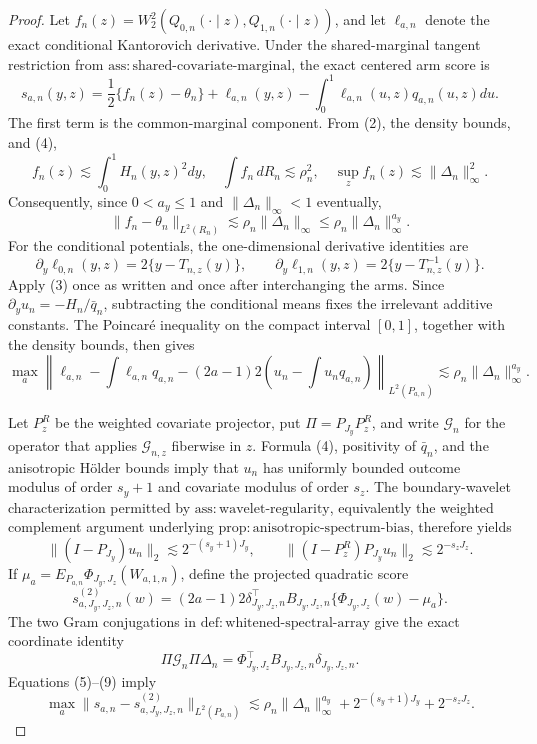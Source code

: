 \documentclass{article}
\begin{document}
\begin{proof}
Let \(f_n(z)=W_2^2(Q_{0,n}(\cdot\mid z),Q_{1,n}(\cdot\mid z))\), and let \(\ell_{a,n}\) denote the exact conditional Kantorovich derivative. Under the shared-marginal tangent restriction from \(\mathrm{ass{:}shared\text{-}covariate\text{-}marginal}\), the exact centered arm score is
\[
s_{a,n}(y,z)
=\frac12\{f_n(z)-\theta_n\}
+\ell_{a,n}(y,z)-\int_0^1\ell_{a,n}(u,z)q_{a,n}(u,z)du. \tag{5}
\]
The first term is the common-marginal component. From (2), the density bounds, and (4),
\[
f_n(z)\lesssim\int_0^1H_n(y,z)^2dy,
\quad
\int f_n\,dR_n\lesssim\rho_n^2,
\quad
\sup_z f_n(z)\lesssim\|\Delta_n\|_\infty^2.
\]
Consequently, since \(0<a_y\le1\) and \(\|\Delta_n\|_\infty<1\) eventually,
\[
\|f_n-\theta_n\|_{L^2(R_n)}
\lesssim\rho_n\|\Delta_n\|_\infty
\le\rho_n\|\Delta_n\|_\infty^{a_y}. \tag{6}
\]
For the conditional potentials, the one-dimensional derivative identities are
\[
\partial_y\ell_{0,n}(y,z)=2\{y-T_{n,z}(y)\},
\qquad
\partial_y\ell_{1,n}(y,z)=2\{y-T_{n,z}^{-1}(y)\}.
\]
Apply (3) once as written and once after interchanging the arms. Since \(\partial_yu_n=-H_n/\bar q_n\), subtracting the conditional means fixes the irrelevant additive constants. The Poincar\'e inequality on the compact interval \([0,1]\), together with the density bounds, then gives
\[
\max_a\left\|
\ell_{a,n}-\int\ell_{a,n}q_{a,n}
-(2a-1)2\left(u_n-\int u_nq_{a,n}\right)
\right\|_{L^2(P_{a,n})}
\lesssim\rho_n\|\Delta_n\|_\infty^{a_y}. \tag{7}
\]

Let \(P_z^R\) be the weighted covariate projector, put \(\Pi=P_{J_y}P_z^R\), and write \(\mathcal G_n\) for the operator that applies \(\mathcal G_{n,z}\) fiberwise in \(z\). Formula (4), positivity of \(\bar q_n\), and the anisotropic H\"older bounds imply that \(u_n\) has uniformly bounded outcome modulus of order \(s_y+1\) and covariate modulus of order \(s_z\). The boundary-wavelet characterization permitted by \(\mathrm{ass{:}wavelet\text{-}regularity}\), equivalently the weighted complement argument underlying \(\mathrm{prop{:}anisotropic\text{-}spectrum\text{-}bias}\), therefore yields
\[
\|(I-P_{J_y})u_n\|_2\lesssim2^{-(s_y+1)J_y},
\qquad
\|(I-P_z^R)P_{J_y}u_n\|_2\lesssim2^{-s_zJ_z}. \tag{8}
\]
If \(\mu_a=E_{P_{a,n}}\Phi_{J_y,J_z}(W_{a,1,n})\), define the projected quadratic score
\[
s^{(2)}_{a,J_y,J_z,n}(w)
=(2a-1)2\delta_{J_y,J_z,n}^{\top}B_{J_y,J_z,n}
\{\Phi_{J_y,J_z}(w)-\mu_a\}.
\]
The two Gram conjugations in \(\mathrm{def{:}whitened\text{-}spectral\text{-}array}\) give the exact coordinate identity
\[
\Pi\mathcal G_n\Pi\Delta_n
=\Phi_{J_y,J_z}^{\top}B_{J_y,J_z,n}\delta_{J_y,J_z,n}. \tag{9}
\]
Equations (5)--(9) imply
\[
\max_a\|s_{a,n}-s^{(2)}_{a,J_y,J_z,n}\|_{L^2(P_{a,n})}
\lesssim
\rho_n\|\Delta_n\|_\infty^{a_y}
+2^{-(s_y+1)J_y}+2^{-s_zJ_z}. \tag{10}
\]


\end{proof}
\end{document}
